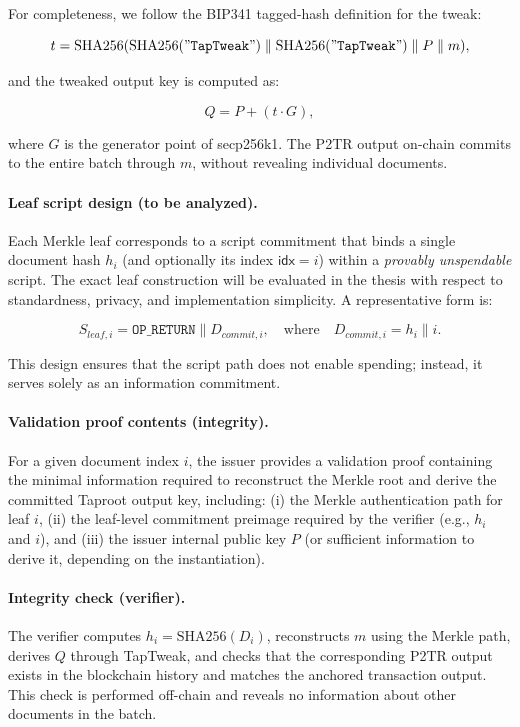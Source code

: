 For completeness, we follow the BIP341 tagged-hash definition for the tweak:

\begin{equation}
t = \mathrm{SHA256}(\mathrm{SHA256}(\mathtt{"TapTweak"}) \parallel \mathrm{SHA256}(\mathtt{"TapTweak"}) \parallel P \parallel m),
\label{eq:taptweak}
\end{equation}

and the tweaked output key is computed as:

\[
Q = P + (t \cdot G),
\]

where $G$ is the generator point of secp256k1.
The P2TR output on-chain commits to the entire batch through $m$, without revealing individual documents.

\paragraph{Leaf script design (to be analyzed).}
Each Merkle leaf corresponds to a script commitment that binds a single document hash $h_i$ (and optionally its index $\mathsf{idx}=i$) within a \emph{provably unspendable} script.
The exact leaf construction will be evaluated in the thesis with respect to standardness, privacy, and implementation simplicity.
A representative form is:

\[
S_{leaf,i} = \mathtt{OP\_RETURN} \parallel D_{commit,i},
\quad \text{where} \quad D_{commit,i} = h_i \parallel i.
\]

This design ensures that the script path does not enable spending; instead, it serves solely as an information commitment.

\paragraph{Validation proof contents (integrity).}
For a given document index $i$, the issuer provides a validation proof containing the minimal information required to reconstruct the Merkle root and derive the committed Taproot output key, including:
(i) the Merkle authentication path for leaf $i$,
(ii) the leaf-level commitment preimage required by the verifier (e.g., $h_i$ and $i$), and
(iii) the issuer internal public key $P$ (or sufficient information to derive it, depending on the instantiation).

\paragraph{Integrity check (verifier).}
The verifier computes $h_i = \mathrm{SHA256}(D_i)$, reconstructs $m$ using the Merkle path, derives $Q$ through TapTweak, and checks that the corresponding P2TR output exists in the blockchain history and matches the anchored transaction output.
This check is performed off-chain and reveals no information about other documents in the batch.

